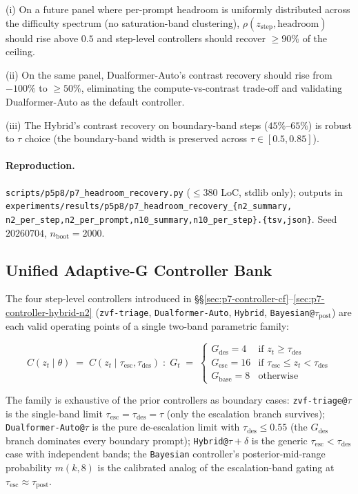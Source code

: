 \documentclass{article}
\begin{document}
(i) On a future panel where per-prompt headroom is uniformly
distributed across the difficulty spectrum (no saturation-band
clustering), $\rho(z_{\mathrm{step}}, \mathrm{headroom})$ should
rise above $0.5$ and step-level controllers should recover
$\ge 90\%$ of the ceiling.

(ii) On the same panel, Dualformer-Auto's contrast recovery should
rise from $-100\%$ to $\ge 50\%$, eliminating the compute-vs-contrast
trade-off and validating Dualformer-Auto as the default controller.

(iii) The Hybrid's contrast recovery on boundary-band steps
($45$\%--$65\%$) is robust to $\tau$ choice (the boundary-band width
is preserved across $\tau \in [0.5, 0.85]$).

\paragraph{Reproduction.}
\texttt{scripts/p5p8/p7\_headroom\_recovery.py}
($\leq 380$ LoC, stdlib only); outputs in
\texttt{experiments/results/p5p8/p7\_headroom\_recovery\_\{n2\_summary,
n2\_per\_step,n2\_per\_prompt,n10\_summary,n10\_per\_step\}.\{tsv,json\}}.
Seed $20260704$, $n_{\mathrm{boot}}{=}2000$.


\subsection{Unified Adaptive-G Controller Bank}
\label{sec:p7-controller-bank}

The four step-level controllers introduced in
\S\S\ref{sec:p7-controller-cf}--\ref{sec:p7-controller-hybrid-n2}
(\texttt{zvf-triage}, \texttt{Dualformer-Auto}, \texttt{Hybrid},
\texttt{Bayesian@$\tau_{\mathrm{post}}$}) are each valid operating
points of a single two-band parametric family:

\begin{equation}
C(z_t \mid \theta) \;=\; C(z_t \mid \tau_{\mathrm{esc}}, \tau_{\mathrm{des}}) \;:\;
G_t \;=\; \begin{cases}
G_{\mathrm{des}}=4 & \text{if } z_t \ge \tau_{\mathrm{des}} \\
G_{\mathrm{esc}}=16 & \text{if } \tau_{\mathrm{esc}} \le z_t < \tau_{\mathrm{des}} \\
G_{\mathrm{base}}=8 & \text{otherwise}
\end{cases}
\label{eq:p7-unified}
\end{equation}

The family is exhaustive of the prior controllers as boundary cases:
\texttt{zvf-triage@$\tau$} is the single-band limit
$\tau_{\mathrm{esc}}=\tau_{\mathrm{des}}=\tau$ (only the escalation
branch survives); \texttt{Dualformer-Auto@$\tau$} is the pure
de-escalation limit with $\tau_{\mathrm{des}}\le 0.55$ (the
$G_{\mathrm{des}}$ branch dominates every boundary prompt);
\texttt{Hybrid@$\tau+\delta$} is the generic $\tau_{\mathrm{esc}} < \tau_{\mathrm{des}}$
case with independent bands; the \texttt{Bayesian} controller's
posterior-mid-range probability $m(k,8)$ is the calibrated analog
of the escalation-band gating at $\tau_{\mathrm{esc}}\approx \tau_{\mathrm{post}}$.
\end{document}
